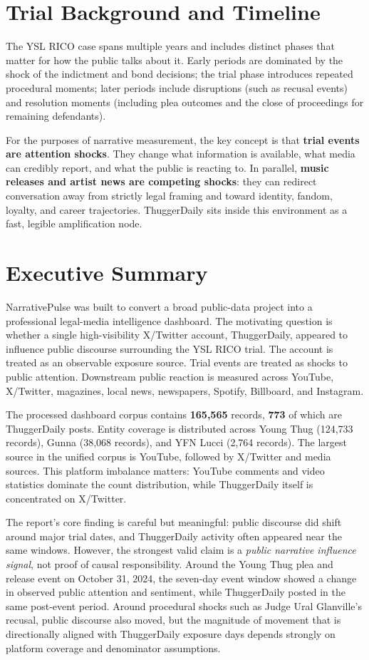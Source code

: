 \documentclass[12pt]{article}
\begin{document}
\section{Trial Background and Timeline}
The YSL RICO case spans multiple years and includes distinct phases that matter for how the public talks about it. Early periods are dominated by the shock of the indictment and bond decisions; the trial phase introduces repeated procedural moments; later periods include disruptions (such as recusal events) and resolution moments (including plea outcomes and the close of proceedings for remaining defendants).

For the purposes of narrative measurement, the key concept is that \textbf{trial events are attention shocks}. They change what information is available, what media can credibly report, and what the public is reacting to. In parallel, \textbf{music releases and artist news are competing shocks}: they can redirect conversation away from strictly legal framing and toward identity, fandom, loyalty, and career trajectories. ThuggerDaily sits inside this environment as a fast, legible amplification node.

\section{Executive Summary}
NarrativePulse was built to convert a broad public-data project into a professional legal-media intelligence dashboard. The motivating question is whether a single high-visibility X/Twitter account, ThuggerDaily, appeared to influence public discourse surrounding the YSL RICO trial. The account is treated as an observable exposure source. Trial events are treated as shocks to public attention. Downstream public reaction is measured across YouTube, X/Twitter, magazines, local news, newspapers, Spotify, Billboard, and Instagram.

The processed dashboard corpus contains \textbf{165,565} records, \textbf{773} of which are ThuggerDaily posts. Entity coverage is distributed across Young Thug (124,733 records), Gunna (38,068 records), and YFN Lucci (2,764 records). The largest source in the unified corpus is YouTube, followed by X/Twitter and media sources. This platform imbalance matters: YouTube comments and video statistics dominate the count distribution, while ThuggerDaily itself is concentrated on X/Twitter.

The report's core finding is careful but meaningful: public discourse did shift around major trial dates, and ThuggerDaily activity often appeared near the same windows. However, the strongest valid claim is a \emph{public narrative influence signal}, not proof of causal responsibility. Around the Young Thug plea and release event on October 31, 2024, the seven-day event window showed a change in observed public attention and sentiment, while ThuggerDaily posted in the same post-event period. Around procedural shocks such as Judge Ural Glanville's recusal, public discourse also moved, but the magnitude of movement that is directionally aligned with ThuggerDaily exposure days depends strongly on platform coverage and denominator assumptions.
\end{document}
